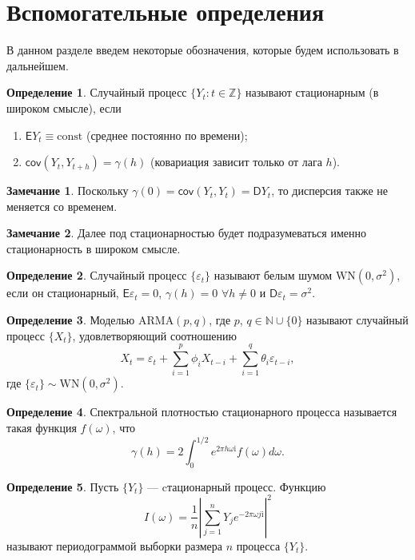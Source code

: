 \documentclass[specialist,
substylefile = spbu_report.rtx,
subf,href,colorlinks=true, 12pt]{disser}
\theoremstyle{definition}
\newtheorem{definition}{Определение}[section]
\newtheorem{remark}{Замечание}[section]
\newcommand{\Z}{\mathbb{Z}}
\newcommand{\const}{\mathrm{const}}
\newcommand{\im}{\mathrm{i}}
\begin{document}
\section{Вспомогательные определения}
В данном разделе введем некоторые обозначения, которые будем использовать в дальнейшем.
\begin{definition}\label{def:stationary}
	Случайный процесс $\{Y_t:t\in\Z\}$ называют стационарным (в широком смысле), если
	\begin{enumerate}
		\item $\mathsf{E}Y_t\equiv\const$ (среднее постоянно по времени);
		\item $\mathsf{cov}(Y_t,Y_{t+h})=\gamma(h)$ (ковариация зависит только от лага $h$).
	\end{enumerate}
\end{definition}
\begin{remark}
	Поскольку $\gamma(0)=\mathsf{cov}(Y_t,Y_t)=\mathsf{D}Y_t$, то дисперсия также не меняется со временем.
\end{remark}
\begin{remark}
	Далее под стационарностью будет подразумеваться именно стационарность в широком смысле.
\end{remark}
\begin{definition}
	Случайный процесс $\{\varepsilon_t\}$ называют белым шумом $\mathrm{WN}(0, \sigma^2)$, если он стационарный, $\mathsf{E}\varepsilon_t=0$, $\gamma(h)=0$ $\forall h\ne 0$ и $\mathsf{D}\varepsilon_t=\sigma^2$.
\end{definition}

\begin{definition}
	Моделью $\mathrm{ARMA}(p, q)$, где $p$, $q\in \mathbb{N}\cup\{0\}$ называют случайный процесс $\{X_t\}$, удовлетворяющий соотношению
	\[
	X_t=\varepsilon_t + \sum_{i=1}^p \phi_i X_{t-i} + \sum_{i=1}^q\theta_i\varepsilon_{t-i},
	\]
	где $\{\varepsilon_t\}\sim\mathrm{WN}(0, \sigma^2)$.
\end{definition}

\begin{definition}
	Спектральной плотностью стационарного процесса называется такая функция $f(\omega)$, что
	\[
		\gamma(h)=2\int_{0}^{1/2} e^{2\pi h\omega\im}f(\omega)d\omega.
	\]
\end{definition}
\begin{definition}
	Пусть $\{Y_t\}$ --- cтационарный процесс. Функцию
	\[
		I(\omega)=\frac1n\left|\sum_{j=1}^{n} Y_je^{-2\pi \omega j\mathrm{i}}\right|^2
	\]
	называют периодограммой выборки размера $n$ процесса $\{Y_t\}$.
\end{definition}
\end{document}
